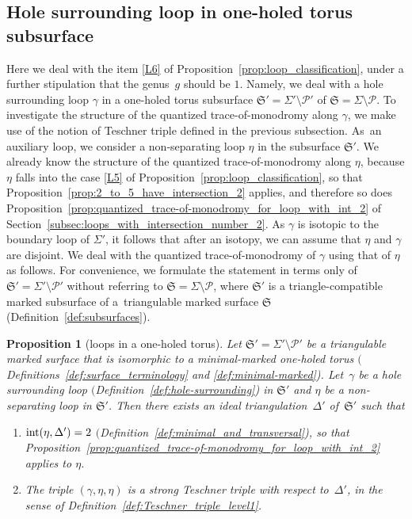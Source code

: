 \documentclass[10pt,a4paper]{amsart}
\numberwithin{equation}{section}
\newtheorem{Proposition}[Theorem]{Proposition}
\theoremstyle{definition}
\begin{document}
\subsection{Hole surrounding loop in one-holed torus subsurface}
\label{subsec:loops_in_one-holed_torus}
Here we deal with the item \ref{L6} of Proposition~\ref{prop:loop_classification}, under a further stipulation that the genus~$g$ should be $1$. Namely, we deal with a hole surrounding loop $\gamma$ in a one-holed torus subsurface $\mathfrak{S}' = \Sigma' \setminus \mathcal{P}'$ of $\mathfrak{S} = \Sigma\setminus\mathcal{P}$. To investigate the structure of the quantized trace-of-monodromy along $\gamma$, we make use of the notion of Teschner triple defined in the previous subsection. As~an auxiliary loop, we consider a non-separating loop $\eta$ in the subsurface $\mathfrak{S}'$. We already know the structure of the quantized trace-of-monodromy along $\eta$, because $\eta$ falls into the case \ref{L5} of Proposition~\ref{prop:loop_classification}, so that Proposition~\ref{prop:2_to_5_have_intersection_2} applies, and therefore so does Proposition~\ref{prop:quantized_trace-of-monodromy_for_loop_with_int_2} of Section~\ref{subsec:loops_with_intersection_number_2}. As $\gamma$ is isotopic to the boundary loop of $\Sigma'$, it follows that after an isotopy, we can assume that $\eta$ and $\gamma$ are disjoint. We deal with the quantized trace-of-monodromy of $\gamma$ using that of $\eta$ as follows. For convenience, we formulate the statement in terms only of $\mathfrak{S}' = \Sigma' \setminus \mathcal{P}'$ without referring to $\mathfrak{S} = \Sigma \setminus \mathcal{P}$, where $\mathfrak{S}'$ is a triangle-compatible marked subsurface of a~triangulable marked surface $\mathfrak{S}$ (Definition~\ref{def:subsurfaces}).
\begin{Proposition}[loops in a one-holed torus]
\label{prop:loops_in_a_one-holed_torus}
Let $\mathfrak{S}' = \Sigma'\setminus\mathcal{P}'$ be a triangulable marked surface that is isomorphic to a minimal-marked one-holed torus $($Definitions~{\rm \ref{def:surface_terminology}} and {\rm \ref{def:minimal-marked})}. Let~$\gamma$ be a hole surrounding loop $($Definition~{\rm \ref{def:hole-surrounding})} in $\mathfrak{S}'$ and $\eta$ be a non-separating loop in $\mathfrak{S}'$. Then there exists an ideal triangulation~$\Delta'$ of~$\mathfrak{S}'$ such that
\begin{enumerate}\itemsep=0pt
\item[\rm (1)] ${\rm int}(\eta,\Delta')=2$ $($Definition~{\rm \ref{def:minimal_and_transversal})}, so that Proposition~{\rm \ref{prop:quantized_trace-of-monodromy_for_loop_with_int_2}} applies to $\eta$.
\item[\rm (2)] The triple $(\gamma,\eta,\eta)$ is a strong Teschner triple with respect to~$\Delta'$, in the sense of Definition~{\rm \ref{def:Teschner_triple_level1}}.
\end{enumerate}
\end{Proposition}
\end{document}
